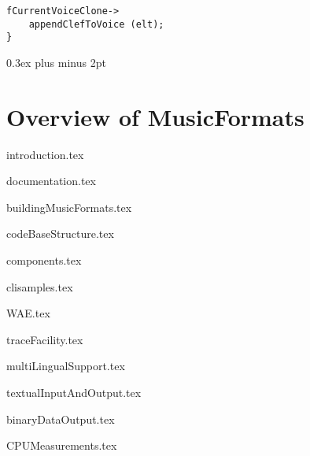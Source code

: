 \documentclass[11pt,a4paper]{report}
\begin{document}
\begin{titlepage}
\begin{center}
\begin{turn}{-1}
{\begin{minipage}{\linewidth}
\begin{lstlisting}[language=Terminal]
  fCurrentVoiceClone->
    appendClefToVoice (elt);
}\end{lstlisting} %
\end{minipage}
}
\end{turn}

  \vfill

  \end{center}
\end{titlepage}


{
	\small

  \setlength {\parskip} {0.3ex plus \baselineskip minus 2pt}

  \tableofcontents

  \listoffigures

  \lstlistoflistings
}


\part{Overview of MusicFormats}


\useRegularPagesHeadersAndFooters


{introduction.tex}

{documentation.tex}

{buildingMusicFormats.tex}

{codeBaseStructure.tex}

{components.tex}

{clisamples.tex}

{WAE.tex}

{traceFacility.tex}

{multiLingualSupport.tex}

{textualInputAndOutput.tex}

{binaryDataOutput.tex}

{CPUMeasurements.tex}


\end{document}

